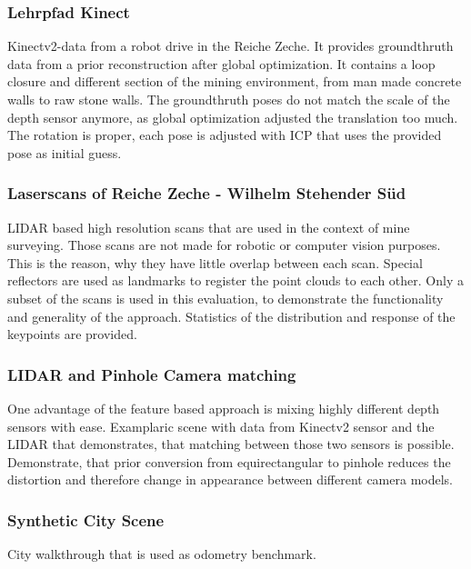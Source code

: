 \subsubsection{Lehrpfad Kinect}

Kinectv2-data from a robot drive in the Reiche Zeche.
It provides groundthruth data from a prior reconstruction after global optimization.
It contains a loop closure and different section of the mining environment, from man made concrete walls to raw stone walls.
The groundthruth poses do not match the scale of the depth sensor anymore, as global optimization adjusted the translation too much.
The rotation is proper, each pose is adjusted with ICP that uses the provided pose as initial guess.


\subsubsection{Laserscans of Reiche Zeche - Wilhelm Stehender Süd}

LIDAR based high resolution scans that are used in the context of mine surveying.
Those scans are not made for robotic or computer vision purposes.
This is the reason, why they have little overlap between each scan.
Special reflectors are used as landmarks to register the point clouds to each other.
Only a subset of the scans is used in this evaluation, to demonstrate the functionality and generality of the approach.
Statistics of the distribution and response of the keypoints are provided.

\subsubsection{LIDAR and Pinhole Camera matching}

One advantage of the feature based approach is mixing highly different depth sensors with ease.
Examplaric scene with data from Kinectv2 sensor and the LIDAR that demonstrates, that matching between those two sensors is possible.
Demonstrate, that prior conversion from equirectangular to pinhole reduces the distortion and therefore change in appearance between different camera models.


\subsubsection{Synthetic City Scene}

City walkthrough that is used as odometry benchmark.


